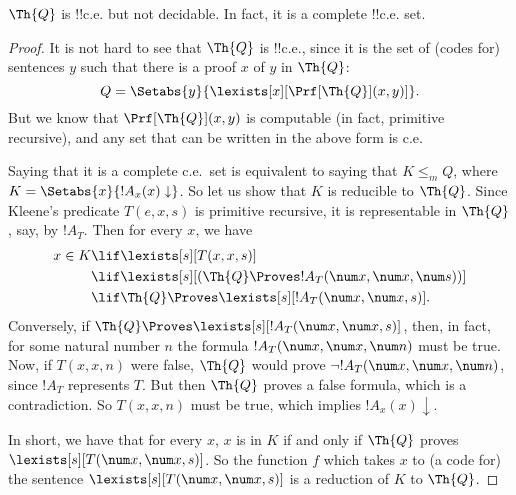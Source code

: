 \documentclass[../../../include/open-logic-section]{subfiles}
\begin{document}



\begin{thm}
$\Th{Q}$ is !!{c.e.} but not decidable. In fact, it is a complete
  !!{c.e.} set.
\end{thm}

\begin{proof}
It is not hard to see that $\Th{Q}$ is !!{c.e.}, since it is the set of
(codes for) sentences $y$ such that there is a proof $x$ of $y$ in
$\Th{Q}$:
\[
Q = \Setabs{y}{\lexists[x][\Prf[\Th{Q}](x,y)]}.
\]
But we know that $\Prf[\Th{Q}](x,y)$ is computable (in fact, primitive
recursive), and any set that can be written in the above form is c.e.

Saying that it is a complete c.e.\ set is equivalent to saying that $K
\leq_m Q$, where $K = \Setabs{x}{!A_x(x) \downarrow}$. So let us show
that $K$ is reducible to $\Th{Q}$. Since Kleene's predicate $T(e,x,s)$ is
primitive recursive, it is representable in $\Th{Q}$, say, by $!A_T$. Then
for every $x$, we have
\begin{align*}
x \in K & \lif \lexists[s][T(x,x,s)] \\
& \lif \lexists[s][(\Th{Q} \Proves !A_T(\num x,\num x, \num s))]
  \\
& \lif \Th{Q} \Proves \lexists[s][!A_T(\num x, \num x, s)].
\end{align*}
Conversely, if $\Th{Q} \Proves \lexists[s][!A_T(\num x, \num x, s)]$,
then, in fact, for some natural number $n$ the formula $!A_T(\num x,
\num x, \num n)$ must be true.  Now, if $T(x,x,n)$ were false,
$\Th{Q}$ would prove $\lnot !A_T(\num x, \num x, \num n)$, since
$!A_T$ represents $T$.  But then $\Th{Q}$ proves a false formula,
which is a contradiction. So $T(x,x,n)$ must be true, which implies
$!A_x(x) \downarrow$.

In short, we have that for every $x$, $x$ is in $K$ if and only if
$\Th{Q}$ proves $\lexists[s][T(\num x,\num x,s)]$. So the function $f$
which takes $x$ to (a code for) the sentence $\lexists[s][T(\num x,
  \num x, s)]$ is a reduction of $K$ to $\Th{Q}$.
\end{proof}
\end{document}
